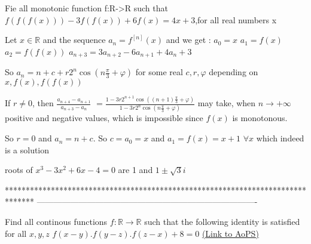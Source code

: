 


\begin{solution}
	\begin{tcolorbox}Fie all monotonic function f:R->R such that $f(f(f(x)))-3f(f(x))+6f(x)=4x+3$,for all real numbers x\end{tcolorbox}
Let $x\in\mathbb R$ and the sequence $a_n=f^{[n]}(x)$ and we get :
$a_0=x$
$a_1=f(x)$
$a_2=f(f(x))$
$a_{n+3}=3a_{n+2}-6a_{n+1}+4a_n+3$

So $a_n=n+c+r2^n\cos(n\frac{\pi}3+\varphi)$ for some real $c,r,\varphi$ depending on $x,f(x), f(f(x))$

If $r\ne 0$, then $\frac{a_{n+4}-a_{n+1}}{a_{n+3}-a_n}$ $=\frac{1-3r2^{n+1}\cos((n+1)\frac{\pi}3+\varphi)}{1-3r2^{n}\cos(n\frac{\pi}3+\varphi)}$ may take, when $n\to +\infty$ positive and negative values, which is impossible since $f(x)$ is monotonous.

So $r=0$ and $a_n=n+c$. So $c=a_0=x$ and $a_1=\boxed{f(x)=x+1}$ $\forall x$ which indeed is a solution
\end{solution}



\begin{solution}
	roots of $x^3-3x^2+6x-4=0$ are 1 and $1\pm \sqrt{3}i$
\end{solution}
*******************************************************************************
-------------------------------------------------------------------------------

\begin{problem}
	Find all continous functions $f:\mathbb{R}\to\mathbb{R}$ such that the following identity is satisfied for all $x,y,z$ 
$f(x-y).f(y-z).f(z-x)+8=0$
	\flushright \href{https://artofproblemsolving.com/community/c6h579116}{(Link to AoPS)}
\end{problem}




